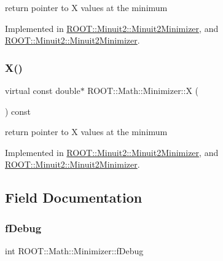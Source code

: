 return pointer to X values at the minimum 



Implemented in \mbox{\hyperlink{classROOT_1_1Minuit2_1_1Minuit2Minimizer_ac9372eb08937cf14acb8862ba3166c26}{R\+O\+O\+T\+::\+Minuit2\+::\+Minuit2\+Minimizer}}, and \mbox{\hyperlink{classROOT_1_1Minuit2_1_1Minuit2Minimizer_ac9372eb08937cf14acb8862ba3166c26}{R\+O\+O\+T\+::\+Minuit2\+::\+Minuit2\+Minimizer}}.

\mbox{\label{classROOT_1_1Math_1_1Minimizer_a35c7c2caf54e548f892d84795209edad}} 
\subsubsection{\texorpdfstring{X()}{X()}\hspace{0.1cm}{\footnotesize\ttfamily [2/2]}}
{\footnotesize\ttfamily virtual const double$\ast$ R\+O\+O\+T\+::\+Math\+::\+Minimizer\+::X (\begin{DoxyParamCaption}{ }\end{DoxyParamCaption}) const\hspace{0.3cm}{\ttfamily [pure virtual]}}



return pointer to X values at the minimum 



Implemented in \mbox{\hyperlink{classROOT_1_1Minuit2_1_1Minuit2Minimizer_ac9372eb08937cf14acb8862ba3166c26}{R\+O\+O\+T\+::\+Minuit2\+::\+Minuit2\+Minimizer}}, and \mbox{\hyperlink{classROOT_1_1Minuit2_1_1Minuit2Minimizer_ac9372eb08937cf14acb8862ba3166c26}{R\+O\+O\+T\+::\+Minuit2\+::\+Minuit2\+Minimizer}}.



\subsection{Field Documentation}
\mbox{\label{classROOT_1_1Math_1_1Minimizer_a76f49eba837f9697e9eece2060c6242a}} 
\subsubsection{\texorpdfstring{fDebug}{fDebug}}
{\footnotesize\ttfamily int R\+O\+O\+T\+::\+Math\+::\+Minimizer\+::f\+Debug\hspace{0.3cm}{\ttfamily [protected]}}

